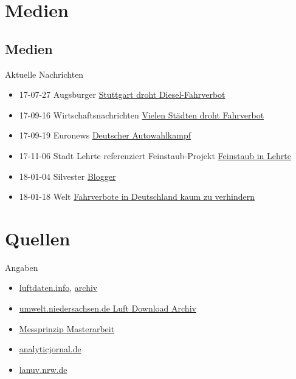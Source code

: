 \documentclass[aspectratio=169]{beamer} %
\begin{document}
\section{Medien}
\subsection{Medien}
\begin{frame}{Aktuelle Nachrichten}
  \begin{itemize}
  \item 17-07-27 Augsburger \href{http://www.augsburger-allgemeine.de/panorama/In-Stuttgart-droht-jetzt-ein-Diesel-Fahrverbot-id42204121.html}{Stuttgart droht Diesel-Fahrverbot}
  \item 17-09-16 Wirtschaftsnachrichten \href{https://deutsche-wirtschafts-nachrichten.de/2017/09/16/feinstaub-belastung-vielen-staedten-drohen-fahrverbote/}{Vielen Städten droht Fahrverbot}
  \item 17-09-19 Euronews \href{http://de.euronews.com/2017/09/19/der-deutsche-autowahlkampf}{Deutscher Autowahlkampf}
  \item 17-11-06 Stadt Lehrte referenziert Feinstaub-Projekt \href{http://piratenpartei-lehrte.de/2017/09/11/feinstaub-in-lehrte/}{Feinstaub in Lehrte}
  \item 18-01-04 Silvester \href{https://sbamueller.wordpress.com/2018/01/01/silvester-und-feinstaub/}{Blogger}
  \item 18-01-18 Welt \href{https://www.welt.de/wirtschaft/article172580444/Fahrverbote-kann-Deutschland-kaum-noch-verhindern.html}{Fahrverbote in Deutschland kaum zu verhindern}
  \end{itemize}
\end{frame}

\section{Quellen}
\begin{frame}{Angaben}
  \begin{itemize}
  \item \href{http://luftdaten.info/}{luftdaten.info}, \href{https://archive.luftdaten.info/}{archiv}
  \item \href{https://www.umwelt.niedersachsen.de/themen/luft/luen/aktuelle_messwerte/archiv/download/}{umwelt.niedersachsen.de Luft Download Archiv}
  \item \href{www.bund-neckar-alb.de/fileadmin/rv_neckar-alb/MasterarbeitBlonFeinstaubmessungimVergleich2017.pdf}{Messprinzip Masterarbeit}
  \item \href{www.analyticjournal.de/fachreports/grimm_nano_tubln_07_09/grimm_nano_pesch.pdf}{analyticjornal.de}
  \item \href{https://www.lanuv.nrw.de/fileadmin/lanuv/gesundheit/schadstoffe/gesundheitliche_wirkungen.pdf}{lanuv.nrw.de}
  \end{itemize}
\end{frame}
\end{document}
